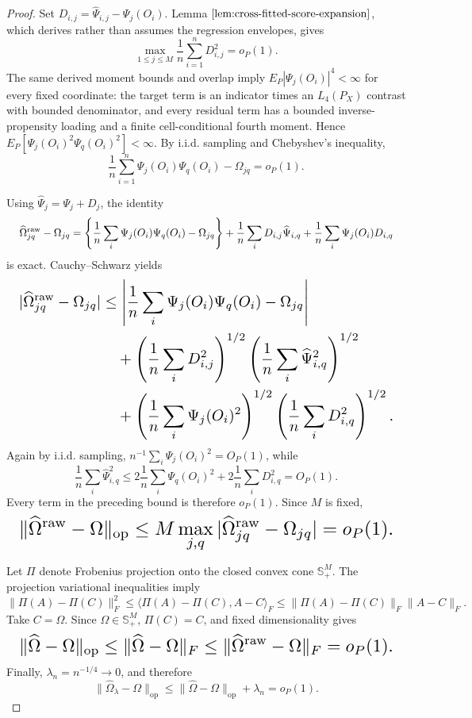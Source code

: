 \documentclass{article}
\begin{document}
\begin{proof}
Set \(D_{i,j}=\widehat\Psi_{i,j}-\Psi_j(O_i)\). Lemma \(\ref{lem:cross-fitted-score-expansion}\), which derives rather than assumes the regression envelopes, gives
\[
 \max_{1\le j\le M}\frac1n\sum_{i=1}^nD_{i,j}^2=o_P(1).
\]
The same derived moment bounds and overlap imply \(E_P|\Psi_j(O_i)|^4<\infty\) for every fixed coordinate: the target term is an indicator times an \(L_4(P_X)\) contrast with bounded denominator, and every residual term has a bounded inverse-propensity loading and a finite cell-conditional fourth moment. Hence \(E_P[\Psi_j(O_i)^2\Psi_q(O_i)^2]<\infty\). By i.i.d. sampling and Chebyshev's inequality,
\[
 \frac1n\sum_{i=1}^n\Psi_j(O_i)\Psi_q(O_i)-\Omega_{jq}=o_P(1).
\]

Using \(\widehat\Psi_j=\Psi_j+D_j\), the identity
\[
\makebox[\linewidth][c]{\resizebox{0.98\linewidth}{!}{\(\displaystyle \widehat\Omega^{\mathrm{raw}}_{jq}-\Omega_{jq}
 =\left\{\frac1n\sum_i\Psi_j(O_i)\Psi_q(O_i)-\Omega_{jq}\right\}
 +\frac1n\sum_iD_{i,j}\widehat\Psi_{i,q}
 +\frac1n\sum_i\Psi_j(O_i)D_{i,q}\)}}
\]
is exact. Cauchy--Schwarz yields
\[
\makebox[\linewidth][c]{\resizebox{0.98\linewidth}{!}{\(\displaystyle \begin{aligned}
 |\widehat\Omega^{\mathrm{raw}}_{jq}-\Omega_{jq}|
 &\le \left|\frac1n\sum_i\Psi_j(O_i)\Psi_q(O_i)-\Omega_{jq}\right|\\
 &\quad+\left(\frac1n\sum_iD_{i,j}^2\right)^{1/2}
       \left(\frac1n\sum_i\widehat\Psi_{i,q}^2\right)^{1/2}\\
 &\quad+\left(\frac1n\sum_i\Psi_j(O_i)^2\right)^{1/2}
       \left(\frac1n\sum_iD_{i,q}^2\right)^{1/2}.
\end{aligned}\)}}
\]
Again by i.i.d. sampling, \(n^{-1}\sum_i\Psi_j(O_i)^2=O_P(1)\), while
\[
 \frac1n\sum_i\widehat\Psi_{i,q}^2
 \le2\frac1n\sum_i\Psi_q(O_i)^2+2\frac1n\sum_iD_{i,q}^2=O_P(1).
\]
Every term in the preceding bound is therefore \(o_P(1)\). Since \(M\) is fixed,
\[
\makebox[\linewidth][c]{\resizebox{0.98\linewidth}{!}{\(\displaystyle \|\widehat\Omega^{\mathrm{raw}}-\Omega\|_{\mathrm{op}}
 \le M\max_{j,q}|\widehat\Omega^{\mathrm{raw}}_{jq}-\Omega_{jq}|=o_P(1).\)}}
\]

Let \(\Pi\) denote Frobenius projection onto the closed convex cone \(\mathbb S_+^M\). The projection variational inequalities imply
\[
 \|\Pi(A)-\Pi(C)\|_F^2
 \le\langle\Pi(A)-\Pi(C),A-C\rangle_F
 \le\|\Pi(A)-\Pi(C)\|_F\|A-C\|_F.
\]
Take \(C=\Omega\). Since \(\Omega\in\mathbb S_+^M\), \(\Pi(C)=C\), and fixed dimensionality gives
\[
\makebox[\linewidth][c]{\resizebox{0.98\linewidth}{!}{\(\displaystyle \|\widehat\Omega-\Omega\|_{\mathrm{op}}
 \le\|\widehat\Omega-\Omega\|_F
 \le\|\widehat\Omega^{\mathrm{raw}}-\Omega\|_F=o_P(1).\)}}
\]
Finally, \(\lambda_n=n^{-1/4}\to0\), and therefore
\[
 \|\widehat\Omega_\lambda-\Omega\|_{\mathrm{op}}
 \le\|\widehat\Omega-\Omega\|_{\mathrm{op}}+\lambda_n=o_P(1).
\]
\end{proof}
\end{document}
